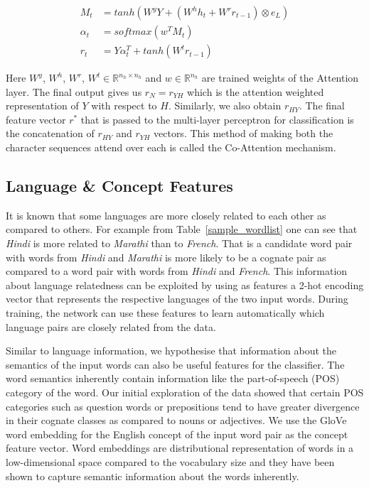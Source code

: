 \documentclass[11pt,letterpaper]{article}
\begin{document}
\begin{align}
M_t &= tanh(W^yY + (W^hh_t + W^rr_{t-1})\otimes e_L) \\
\alpha_t &= softmax(w^TM_t) \\
r_t &= Y\alpha_t^T + tanh(W^tr_{t-1})
\end{align}

Here $W^y$, $W^h$, $W^r$, $W^t \in  \mathbb{R}^{n_h \times n_h}$ and $w \in \mathbb{R}^{n_h}$ are trained weights of the Attention layer. The final output gives us $r_N = r_{YH}$ which is the attention weighted representation of $Y$ with respect to $H$. Similarly, we also obtain $r_{HY}$. The final feature vector $r^*$ that is passed to the multi-layer perceptron for classification is the concatenation of $r_{HY}$ and $r_{YH}$ vectors. This method of making both the character sequences attend over each is called the Co-Attention mechanism.
 
\subsection{Language \& Concept Features}

It is known that some languages are more closely related to each other as compared to others. For example from Table~\ref{sample_wordlist} one can see that \textit{Hindi} is more related to \textit{Marathi} than to \textit{French}. That is a candidate word pair with words from \textit{Hindi} and \textit{Marathi} is more likely to be a cognate pair as compared to a word pair with words from \textit{Hindi} and \textit{French}. This information about language relatedness can be exploited by using as features a 2-hot encoding vector that represents the respective languages of the two input words. During training, the network can use these features to learn automatically which language pairs are closely related from the data.

Similar to language information, we hypothesise that information about the semantics of the input words can also be useful features for the classifier. The word semantics inherently contain information like the part-of-speech (POS) category of the word. Our initial exploration of the data showed that certain POS categories such as question words or prepositions tend to have greater divergence in their cognate classes as compared to nouns or adjectives. We use the GloVe word embedding \cite{pennington2014glove} for the English concept of the input word pair as the concept feature vector. Word embeddings are distributional representation of words in a low-dimensional space compared to the vocabulary size and they have been shown to capture semantic information about the words inherently. 
\end{document}
